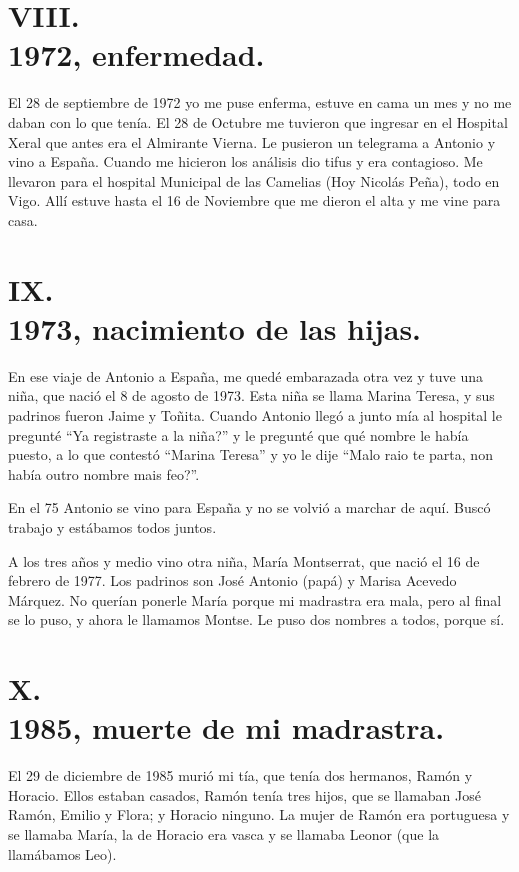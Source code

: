 \documentclass[12pt,a5paper]{book}
\begin{document}
\section*{VIII.\\1972, enfermedad.}

El 28 de septiembre de 1972 yo me puse enferma, estuve en cama un mes y no me daban con lo que tenía. El 28 de Octubre me tuvieron que ingresar en el Hospital Xeral que antes era el Almirante Vierna. Le pusieron un telegrama a Antonio y vino a España. Cuando me hicieron los análisis dio tifus y era contagioso. Me llevaron para el hospital Municipal de las Camelias (Hoy Nicolás Peña), todo en Vigo. Allí estuve hasta el 16 de Noviembre que me dieron el alta y me vine para casa.


\section*{IX.\\1973, nacimiento de las hijas.}

En ese viaje de Antonio a España, me quedé embarazada otra vez y tuve una niña, que nació el 8 de agosto de 1973. Esta niña se llama Marina Teresa, y sus padrinos fueron Jaime y Toñita. Cuando Antonio llegó a junto mía al hospital le pregunté “Ya registraste a la niña?” y le pregunté que qué nombre le había puesto, a lo que contestó “Marina Teresa” y yo le dije “Malo raio te parta, non había outro nombre mais feo?”.

En el 75 Antonio se vino para España y no se volvió a marchar de aquí. Buscó trabajo y estábamos todos juntos.

A los tres años y medio vino otra niña, María Montserrat, que nació el 16 de febrero de 1977. Los padrinos son José Antonio (papá) y Marisa Acevedo Márquez. No querían ponerle María porque mi madrastra era mala, pero al final se lo puso, y ahora le llamamos Montse. Le puso dos nombres a todos, porque sí.

\section*{X.\\1985, muerte de mi madrastra.}

El 29 de diciembre de 1985 murió mi tía, que tenía dos hermanos, Ramón y Horacio. Ellos estaban casados, Ramón tenía tres hijos, que se llamaban José Ramón, Emilio y Flora; y Horacio ninguno. La mujer de Ramón era portuguesa y se llamaba María, la de Horacio era vasca y se llamaba Leonor (que la llamábamos Leo).
\end{document}
